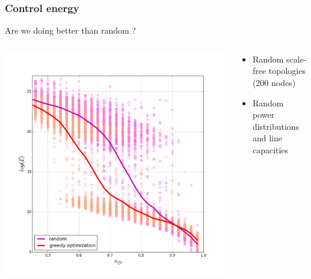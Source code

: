 \documentclass[xcolor=dvipsnames]{beamer}
\begin{document}
\begin{frame}
	\frametitle{Control energy}
	
	Are we doing better than random ?
	\begin{columns}
		\begin{column}{.6\textwidth}		
			\includegraphics[scale=.3]{figure_3.png}
		\end{column}
		\begin{column}{.4\textwidth}
			\begin{itemize}
				\item Random scale-free topologies (200 nodes)
				\item Random power distributions and line capacities
			\end{itemize}
		\end{column}
	\end{columns}
	
\end{frame}
\end{document}
